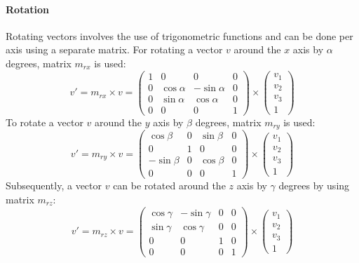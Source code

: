 \paragraph{Rotation} Rotating vectors involves the use of trigonometric functions and can be done per axis using a separate matrix. For rotating a vector $v$ around the $x$ axis by $\alpha$ degrees, matrix $m_{rx}$ is used:
\begin{equation}
    v' = m_{rx} \times v = \begin{pmatrix}
        1 & 0 & 0 &  0\\
        0 & \cos{\alpha} & -\sin{\alpha} & 0\\
        0 & \sin{\alpha} & \cos{\alpha} & 0\\
        0 & 0 & 0 & 1
    \end{pmatrix} \times \begin{pmatrix}v_1 \\ v_2 \\ v_3 \\ 1\end{pmatrix}
\end{equation}
To rotate a vector $v$ around the $y$ axis by $\beta$ degrees, matrix $m_{ry}$ is used:
\begin{equation}
    v' = m_{ry} \times v = \begin{pmatrix}
        \cos{\beta} & 0 & \sin{\beta} &  0\\
        0 & 1 & 0 & 0\\
        -\sin{\beta} & 0 & \cos{\beta} & 0\\
        0 & 0 & 0 & 1
    \end{pmatrix} \times \begin{pmatrix}v_1 \\ v_2 \\ v_3 \\ 1\end{pmatrix}
\end{equation}
Subsequently, a vector $v$ can be rotated around the $z$ axis by $\gamma$ degrees by using matrix $m_{rz}$:
\begin{equation}
    v' = m_{rz} \times v = \begin{pmatrix}
        \cos{\gamma} & -\sin{\gamma} & 0 & 0\\
        \sin{\gamma} & \cos{\gamma} & 0 & 0\\
        0 & 0 & 1 & 0\\
        0 & 0 & 0 & 1
    \end{pmatrix} \times \begin{pmatrix}v_1 \\ v_2 \\ v_3 \\ 1\end{pmatrix}
\end{equation}
